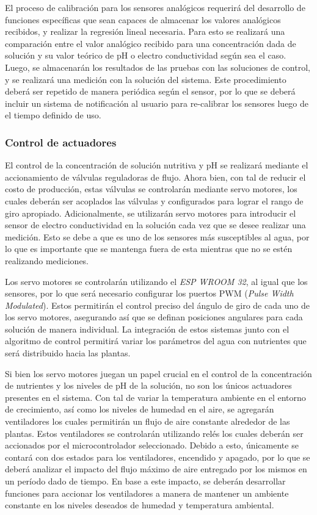 El proceso de calibración para los sensores analógicos requerirá del desarrollo de funciones específicas que sean capaces de almacenar los valores analógicos recibidos, y realizar la regresión lineal necesaria. Para esto se realizará una comparación entre el valor analógico recibido para una concentración dada de solución y su valor teórico de pH o electro conductividad según sea el caso. Luego, se almacenarán los resultados de las pruebas con las soluciones de control, y se realizará una medición con la solución del sistema. Este procedimiento deberá ser repetido de manera periódica según el sensor, por lo que se deberá incluir un sistema de notificación al usuario para re-calibrar los sensores luego de el tiempo definido de uso.

\subsubsection{Control de actuadores}
El control de la concentración de solución nutritiva y pH se realizará mediante el accionamiento de válvulas reguladoras de flujo. Ahora bien, con tal de reducir el costo de producción, estas válvulas se controlarán mediante servo motores, los cuales deberán ser acoplados las válvulas y configurados para lograr el rango de giro apropiado. Adicionalmente, se utilizarán servo motores para introducir el sensor de electro conductividad en la solución cada vez que se desee realizar una medición. Esto se debe a que es uno de los sensores más susceptibles al agua, por lo que es importante que se mantenga fuera de esta mientras que no se estén realizando mediciones.

Los servo motores se controlarán utilizando el \textit{ESP WROOM 32}, al igual que los sensores, por lo que será necesario configurar los puertos PWM (\textit{Pulse Width Modulated}). Estos permitirán el control preciso del ángulo de giro de cada uno de los servo motores, asegurando así que se definan posiciones angulares para cada solución de manera individual. La integración de estos sistemas junto con el algoritmo de control permitirá variar los parámetros del agua con nutrientes que será distribuido hacia las plantas. 

Si bien los servo motores juegan un papel crucial en el control de la concentración de nutrientes y los niveles de pH de la solución, no son los únicos actuadores presentes en el sistema. Con tal de variar la temperatura ambiente en el entorno de crecimiento, así como los niveles de humedad en el aire, se agregarán ventiladores los cuales permitirán un flujo de aire constante alrededor de las plantas. Estos ventiladores se controlarán utilizando relés los cuales deberán ser accionados por el microcontrolador seleccionado. Debido a esto, únicamente se contará con dos estados para los ventiladores, encendido y apagado, por lo que se deberá analizar el impacto del flujo máximo de aire entregado por los mismos en un período dado de tiempo. En base a este impacto, se deberán desarrollar funciones para accionar los ventiladores a manera de mantener un ambiente constante en los niveles deseados de humedad y temperatura ambiental. 

